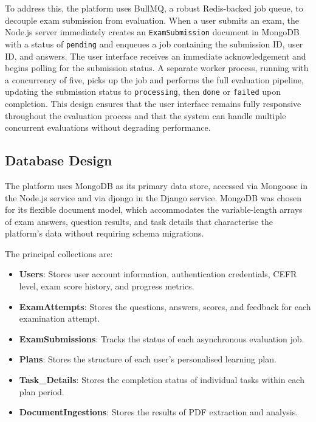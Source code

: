 \documentclass[12pt, a4paper]{report}
\begin{document}
To address this, the platform uses BullMQ, a robust Redis-backed job queue, to decouple exam submission from evaluation. When a user submits an exam, the Node.js server immediately creates an \texttt{ExamSubmission} document in MongoDB with a status of \texttt{pending} and enqueues a job containing the submission ID, user ID, and answers. The user interface receives an immediate acknowledgement and begins polling for the submission status. A separate worker process, running with a concurrency of five, picks up the job and performs the full evaluation pipeline, updating the submission status to \texttt{processing}, then \texttt{done} or \texttt{failed} upon completion. This design ensures that the user interface remains fully responsive throughout the evaluation process and that the system can handle multiple concurrent evaluations without degrading performance.

\subsection{Database Design}

The platform uses MongoDB as its primary data store, accessed via Mongoose in the Node.js service and via djongo in the Django service. MongoDB was chosen for its flexible document model, which accommodates the variable-length arrays of exam answers, question results, and task details that characterise the platform's data without requiring schema migrations.

The principal collections are:

\begin{itemize}
    \item \textbf{Users}: Stores user account information, authentication credentials, CEFR level, exam score history, and progress metrics.
    \item \textbf{ExamAttempts}: Stores the questions, answers, scores, and feedback for each examination attempt.
    \item \textbf{ExamSubmissions}: Tracks the status of each asynchronous evaluation job.
    \item \textbf{Plans}: Stores the structure of each user's personalised learning plan.
    \item \textbf{Task\_Details}: Stores the completion status of individual tasks within each plan period.
    \item \textbf{DocumentIngestions}: Stores the results of PDF extraction and analysis.
\end{itemize}
\end{document}
